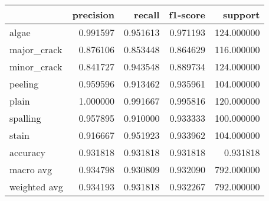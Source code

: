 \begin{tabular}{lrrrr}
\toprule
 & precision & recall & f1-score & support \\
\midrule
algae & 0.991597 & 0.951613 & 0.971193 & 124.000000 \\
major_crack & 0.876106 & 0.853448 & 0.864629 & 116.000000 \\
minor_crack & 0.841727 & 0.943548 & 0.889734 & 124.000000 \\
peeling & 0.959596 & 0.913462 & 0.935961 & 104.000000 \\
plain & 1.000000 & 0.991667 & 0.995816 & 120.000000 \\
spalling & 0.957895 & 0.910000 & 0.933333 & 100.000000 \\
stain & 0.916667 & 0.951923 & 0.933962 & 104.000000 \\
accuracy & 0.931818 & 0.931818 & 0.931818 & 0.931818 \\
macro avg & 0.934798 & 0.930809 & 0.932090 & 792.000000 \\
weighted avg & 0.934193 & 0.931818 & 0.932267 & 792.000000 \\
\bottomrule
\end{tabular}
